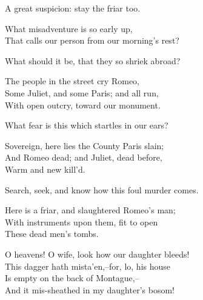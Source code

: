 \begin{speech}
A great suspicion: stay the friar too.  \\
\end{speech}
\begin{speech}
What misadventure is so early up, \\
That calls our person from our morning's rest? 
\\
\end{speech}
\begin{speech}
What should it be, that they so shriek abroad? \\

\end{speech}
\begin{speech}
The people in the street cry Romeo, \\
Some Juliet, and some Paris; and all run, \\
With open outcry, toward our monument. \\
\end{speech}
\begin{speech}
What fear is this which startles in our ears? \\

\end{speech}
\begin{speech}
Sovereign, here lies the County Paris slain;
\\
And Romeo dead; and Juliet, dead before, \\
Warm and new kill'd. \\
\end{speech}
\begin{speech}
Search, seek, and know how this foul murder comes.
\\
\end{speech}
\begin{speech}
Here is a friar, and slaughtered Romeo's man;
\\
With instruments upon them, fit to open \\
These dead men's tombs. \\
\end{speech}
\begin{speech}
O heavens! O wife, look how our daughter bleeds! \\

This dagger hath mista'en,--for, lo, his house \\
Is empty on the back of Montague,-- \\
And it mis-sheathed in my daughter's bosom! \\
\end{speech}
